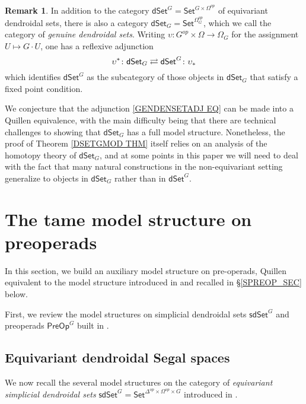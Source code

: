 \documentclass[a4paper,10pt
,draft
]{article}%
\numberwithin{equation}{section}
\numberwithin{figure}{section}
\theoremstyle{definition} %
\newtheorem{remark}[equation]{Remark}%
\newcommand{\Set}{\ensuremath{\mathsf{Set}}}
\newcommand{\dSet}{\mathsf{dSet}}
\newcommand{\1}{\ensuremath{\mathbbm 1}}%
\begin{document}
\begin{remark}\label{GENDENSETADJ REM}
	In addition to the category
	$\mathsf{dSet}^G = \mathsf{Set}^{G \times \Omega^{op}}$
	of equivariant dendroidal sets,
	there is also a category
	$\mathsf{dSet}_G = \mathsf{Set}^{\Omega_G^{op}}$,
	which we call the category of 
	\emph{genuine dendroidal sets}.
	Writing
	$\upsilon \colon G^{op} \times \Omega \to \Omega_G$
	for the assignment
	$U \mapsto G \cdot U$,
	one has a reflexive adjunction 
	\begin{equation}\label{GENDENSETADJ EQ}
	\upsilon^{\**} \colon \dSet_G \rightleftarrows \dSet^G \colon \upsilon_{\**}
	\end{equation}	
	which identifies 
	$\dSet^G$
	as the subcategory of those objects in 
	$\dSet_G$
	that satisfy a fixed point condition.
	
	We conjecture that the adjunction 
	\eqref{GENDENSETADJ EQ}
	can be made into a Quillen equivalence,
	with the main difficulty being that there are technical challenges to showing that $\dSet_G$ has a full model structure.
	Nonetheless, 
	the proof of Theorem \ref{DSETGMOD THM} itself
	relies on an analysis of the homotopy theory of 
	$\dSet_G$, 
	and at some points in this paper  we will need to deal with the fact that many natural constructions in the non-equivariant setting generalize to objects in 
	$\dSet_G$ rather than in $\dSet^G$.
\end{remark}





\section{The tame model structure on preoperads}
\label{TAME_SEC}


{\color{orange}
  In this section, we build an auxiliary model structure on pre-operads,
  Quillen equivalent to the model structure introduced in \cite{BP_edss} and recalled in \S \ref{SPREOP_SEC} below.
}

First, we review the model structures on
simplicial dendroidal sets $\mathsf{sdSet}^G$
and preoperads $\mathsf{PreOp}^G$ built in \cite{BP_edss}.


\subsection{Equivariant dendroidal Segal spaces}
\label{JT_SEC}


We now recall the several model structures on the category of
\textit{equivariant simplicial dendroidal sets}
$\mathsf{sdSet}^G = \Set^{\Delta^{op} \times \Omega^{op} \times G}$
introduced in \cite{BP_edss}.
\end{document}
